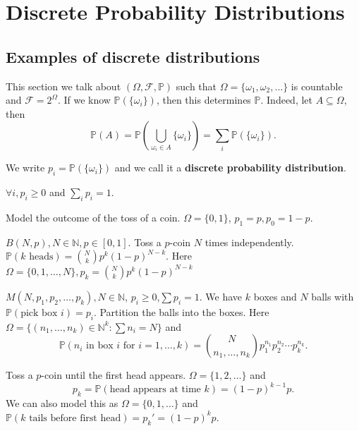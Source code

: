 \section{Discrete Probability Distributions}
\subsection{Examples of discrete distributions}
This section we talk about $ (\Omega,\mathscr{F},\mathbb{P}) $ such that $ \Omega=\{\omega_1,\omega_2,\dots\} $ is countable and $ \mathscr{F} = 2^{\Omega} $. If we know $ \mathbb{P}(\{\omega_i\}) $, then this determines $\mathbb{P}$. Indeed, let $ A \subseteq \Omega $, then
\[
    \mathbb{P}(A) = \mathbb{P}\left( \bigcup_{\omega_i\in A}\{\omega_i\} \right) = \sum_{i} \mathbb{P}(\{\omega_i\}).
\]
\begin{definition}
    We write $ p_i = \mathbb{P}(\{\omega_i\}) $ and we call it a \textbf{discrete probability distribution}.
\end{definition}
\begin{proposition}
    $ \forall i,p_i\ge 0 $ and $ \sum_i p_i=1 $.
\end{proposition}

\begin{example}
    Model the outcome of the toss of a coin. $ \Omega = \{0,1\} $, $ p_1=p,p_0=1-p $.
\end{example}

\begin{example}
    $ B(N,p),N\in \mathbb{N}, p\in [0,1] $. Toss a $p$-coin $N$ times independently. $ \mathbb{P}(k\text{ heads}) = \binom{N}{k}p^k(1-p)^{N-k} $. Here $ \Omega=\{0,1,\dots,N\},p_k=\binom{N}{k}p^k(1-p)^{N-k} $
\end{example}

\begin{example}
    $ M(N,p_1,p_2,\dots,p_k), N\in \mathbb{N}$, $p_i\ge 0$,$\sum p_i=1 $. We have $k$ boxes and $N$ balls with $ \mathbb{P}(\text{pick box }i)=p_i $. Partition the balls into the boxes. Here $ \Omega = \{(n_1,\dots,n_k)\in \mathbb{N}^k: \sum n_i=N\} $ and 
    \[
        \mathbb{P}(n_i \text{ in box }i \text{ for } i=1,\dots,k) = \binom{N}{n_1,\dots,n_k}p_1^{n_1}p_2^{n_2}\cdots p_k^{n_k}.
    \]
\end{example}

\begin{example}
    Toss a $p$-coin until the first head appears. $ \Omega=\{1,2,\dots\} $ and
    \[
        p_k=\mathbb{P}(\text{head appears at time }k)=(1-p)^{k-1}p.
    \]
    We can also model this as $ \Omega=\{0,1,\dots\} $ and $ \mathbb{P}(k \text{ tails before first head})=p_k'=(1-p)^{k}p $.
\end{example}

